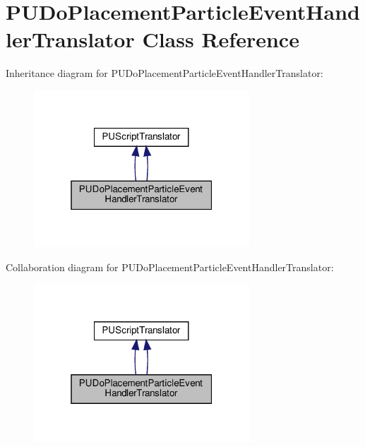 \hypertarget{classPUDoPlacementParticleEventHandlerTranslator}{}\section{P\+U\+Do\+Placement\+Particle\+Event\+Handler\+Translator Class Reference}
\label{classPUDoPlacementParticleEventHandlerTranslator}


Inheritance diagram for P\+U\+Do\+Placement\+Particle\+Event\+Handler\+Translator\+:
\nopagebreak
\begin{figure}[H]
\begin{center}
\leavevmode
\includegraphics[width=229pt]{classPUDoPlacementParticleEventHandlerTranslator__inherit__graph}
\end{center}
\end{figure}


Collaboration diagram for P\+U\+Do\+Placement\+Particle\+Event\+Handler\+Translator\+:
\nopagebreak
\begin{figure}[H]
\begin{center}
\leavevmode
\includegraphics[width=229pt]{classPUDoPlacementParticleEventHandlerTranslator__coll__graph}
\end{center}
\end{figure}
